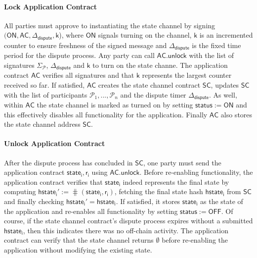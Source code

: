 \documentclass{article}
\newcommand{\chanstatus}{\mathsf{status}}
\newcommand{\chanon}{\mathsf{ON}}
\newcommand{\chanoff}{\mathsf{OFF}}
\newcommand{\hstatei}{\mathsf{hstate}_{\monotoniccounter}}
\newcommand{\monotoniccounter}{\mathsf{i}}
\newcommand{\stateinfoi}{\mathsf{state}_{\mathsf{i}}}
\newcommand{\participant}{\mathcal{P}}
\newcommand{\rani}{\mathsf{r}_{\mathsf{i}}}
\newcommand{\statechannel}{\mathsf{SC}}
\newcommand{\appcontract}{\mathsf{AC}}
\newcommand{\appunlock}{\mathsf{AC.unlock}}
\newcommand{\timerdispute}{\mathsf{\Delta}_{\mathsf{dispute}}}
\begin{document}


 
\paragraph{Lock Application Contract} All parties must approve to instantiating the state channel by signing $(\chanon, \appcontract, \timerdispute, \mathsf{k}$), where $\chanon$ signals turning on the channel, $\mathsf{k}$ is an incremented counter to ensure freshness of the signed message and $\timerdispute$ is the fixed time period for the dispute process. 
Any party can call $\appunlock$ with the list of signatures $\Sigma_{\participant}$, $\timerdispute$ and $\mathsf{k}$ to turn on the state channe. 
The application contract $\appcontract$ verifies all signatures and that $\mathsf{k}$ represents the largest counter received so far.
If satisfied,  $\appcontract$ creates the state channel contract $\statechannel$, updates $\statechannel$ with the list of participants $\participant_{1},...,\participant_{n}$ and the dispute timer $\timerdispute$. 
As well, within $\appcontract$ the state channel is marked as turned on by setting $\chanstatus := \chanon$ and this effectively disables all functionality for the application.
Finally $\appcontract$ also stores the state channel address $\statechannel$. 
 

\paragraph{Unlock Application Contract}

After the dispute process has concluded in $\statechannel$, one party must send the application contract  $\stateinfoi,\rani$ using $\appunlock$. 
Before re-enabling functionality, the application contract verifies that $\stateinfoi$  indeed represents the final state by computing $\hstatei' := \hash(\stateinfoi, \rani)$, fetching the final state hash $\hstatei$ from $\statechannel$ and finally checking  $\hstatei' = \hstatei$. 
If satisfied, it stores $\stateinfoi$ as the  state of the application and re-enables all functionality by setting $\chanstatus := \chanoff$. 
Of course, if the state channel contract's dispute process expires without a submitted $\hstatei$, then this indicates there was no off-chain activity.
The application contract can verify that the state channel returns $\emptyset$ before re-enabling the application without modifying the existing state. 
\end{document}
